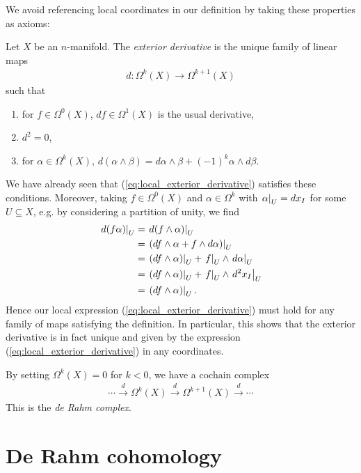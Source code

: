 \documentclass{article}
\begin{document}
We avoid referencing local coordinates in our definition by taking these
properties as axioms:

\begin{definition}
  Let $X$ be an $n$-manifold. The \emph{exterior derivative} is the
  unique family of linear maps
  \begin{align*}
    d : \Omega^k(X) \to \Omega^{k+1}(X)
  \end{align*}
  such that
  \begin{enumerate}
    \item for $f\in\Omega^0(X)$, $df\in\Omega^1(X)$ is the usual derivative,
    \item $d^2 = 0$,
    \item for $\alpha\in\Omega^k(X)$, $d(\alpha\wedge\beta) = d\alpha\wedge\beta + (-1)^k \alpha\wedge d\beta$.
  \end{enumerate}
\end{definition}

We have already seen that (\ref{eq:local_exterior_derivative}) satisfies
these conditions. Moreover, taking $f\in\Omega^0(X)$ and $\alpha\in\Omega^k$
with $\left.{\alpha}\right\vert_{U} = dx_I$ for some $U\subseteq X$, e.g. by considering a partition of unity, we find
\begin{align*}
  \left.{d(f\alpha)}\right\vert_{U}
  &= \left.{d(f\wedge\alpha)}\right\vert_{U}\\
  &= \left.{(df\wedge\alpha + f\wedge d\alpha)}\right\vert_{U}\\
  &= \left.{(df\wedge\alpha)}\right\vert_{U} + \left.{f}\right\vert_{U}\wedge \left.{d\alpha}\right\vert_{U}\\
  &= \left.{(df\wedge\alpha)}\right\vert_{U} + \left.{f}\right\vert_{U}\wedge \left.{d^2x_I}\right\vert_{U}\\
  &= \left.{(df\wedge\alpha)}\right\vert_{U}.
\end{align*}
Hence our local expression (\ref{eq:local_exterior_derivative}) must
hold for any family of maps satisfying the definition. In particular,
this shows that the exterior derivative is in fact unique and given by
the expression (\ref{eq:local_exterior_derivative}) in any coordinates.

By setting $\Omega^k(X)=0$ for $k<0$, we have a cochain complex
\begin{align*}
  \cdots
  \xrightarrow{d} \Omega^k(X)
  \xrightarrow{d} \Omega^{k+1}(X)
  \xrightarrow{d} \cdots
\end{align*}
This is the \emph{de Rahm complex}.


\section{De Rahm cohomology}
\end{document}
